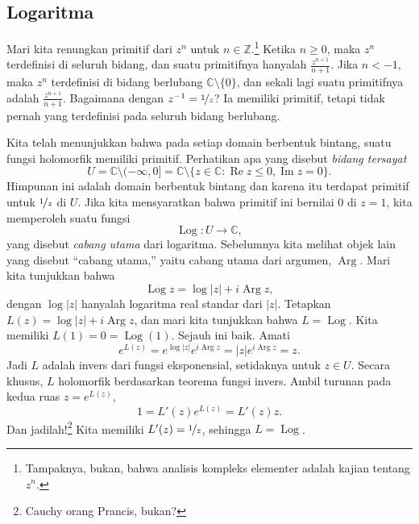 \documentclass[12pt,openany]{book}
\renewcommand{\Re}{\operatorname{Re}}
\renewcommand{\Im}{\operatorname{Im}}
\newcommand{\Arg}{\operatorname{Arg}}
\newcommand{\Log}{\operatorname{Log}}
\newcommand{\sabs}[1]{\lvert {#1} \rvert}
\newcommand{\C}{{\mathbb{C}}}
\newcommand{\Z}{{\mathbb{Z}}}
\newcommand{\myindex}[1]{#1\index{#1}}
\newcommand{\myquote}[1]{``#1''}
\theoremstyle{plain}
\theoremstyle{remark}
\theoremstyle{definition}
\theoremstyle{exercise}
\theoremstyle{example}
\begin{document}
\subsection{Logaritma}

Mari kita renungkan primitif dari $z^n$ untuk $n \in \Z$.\footnote{Tampaknya,
bukan, bahwa analisis kompleks elementer adalah kajian tentang $z^n$.}
Ketika $n \geq 0$, 
maka $z^n$ terdefinisi di seluruh bidang, dan suatu primitifnya hanyalah
$\frac{z^{n+1}}{n+1}$.  Jika $n < -1$, maka $z^n$ terdefinisi
di bidang berlubang $\C \setminus \{0\}$, dan sekali lagi
suatu primitifnya adalah $\frac{z^{n+1}}{n+1}$.  Bagaimana dengan $z^{-1} =
\nicefrac{1}{z}$?  Ia memiliki primitif, tetapi tidak pernah yang terdefinisi pada
seluruh bidang berlubang.

Kita telah menunjukkan bahwa pada setiap domain berbentuk bintang, suatu fungsi holomorfik memiliki
primitif.  Perhatikan apa yang disebut \emph{\myindex{bidang tersayat}}
\begin{equation*}
U = \C \setminus (-\infty,0] = \C \setminus \bigl\{ z \in \C : \Re z \leq 0 , \Im z = 0 \bigr\}.
\end{equation*}
Himpunan ini adalah domain berbentuk bintang dan
karena itu terdapat
primitif untuk $\nicefrac{1}{z}$ di $U$.
Jika kita
mensyaratkan bahwa primitif ini bernilai $0$ di $z=1$,
kita memperoleh suatu fungsi
%
\begin{equation*}
\Log \colon U \to \C ,
\end{equation*}
yang disebut \emph{\myindex{cabang utama}} dari logaritma.
Sebelumnya kita melihat objek lain yang disebut \myquote{cabang utama,} 
yaitu cabang utama dari argumen, $\Arg$.  Mari kita tunjukkan bahwa
\begin{equation*}
\Log z = \log \sabs{z} + i \Arg z ,
\end{equation*}
dengan $\log \sabs{z}$ hanyalah logaritma real standar dari $\sabs{z}$.
Tetapkan $L(z) = \log \sabs{z} + i \Arg z$, dan mari kita tunjukkan bahwa $L = \Log$.
Kita memiliki $L(1) = 0 = \Log(1)$.  Sejauh ini baik.
Amati
\begin{equation*}
e^{L(z)}
=
e^{\log \sabs{z}} e^{i \Arg z}
=
\sabs{z} e^{i \Arg z} = z .
\end{equation*}
Jadi $L$ adalah invers dari fungsi eksponensial, setidaknya untuk $z \in U$.
Secara khusus, $L$ holomorfik berdasarkan teorema fungsi
invers.
Ambil turunan pada kedua ruas $z = e^{L(z)}$,
\begin{equation*}
1 = L'(z) e^{L(z)} = L'(z) z .
\end{equation*}
Dan jadilah!\footnote{Cauchy orang Prancis, bukan?}
Kita memiliki $L'(z) = \nicefrac{1}{z}$, sehingga $L = \Log$.
\end{document}
